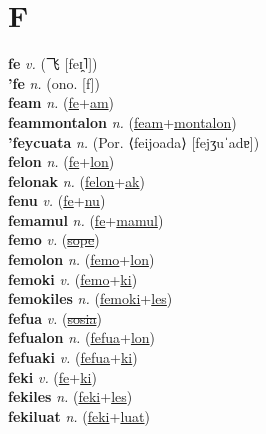 \section{F}

\textbf{fe} \textit{v.} ({\chinese{}飞} [feɪ̯˥])
 \label{fe} \\
\textbf{'fe} \textit{n.} (ono. [f])
 \label{'fe} \\
\textbf{feam} \textit{n.} (\hyperref[fe]{fe}+\hyperref[am]{am})
 \label{feam} \\
\textbf{feammontalon} \textit{n.} (\hyperref[feam]{feam}+\hyperref[montalon]{montalon})
 \label{feammontalon} \\
\textbf{'feycuata} \textit{n.} (Por. ⟨feijoada⟩ [fejʒuˈadɐ])
 \label{'feycuata} \\
\textbf{felon} \textit{n.} (\hyperref[fe]{fe}+\hyperref[lon]{lon})
 \label{felon} \\
\textbf{felonak} \textit{n.} (\hyperref[felon]{felon}+\hyperref[ak]{ak})
 \label{felonak} \\
\textbf{fenu} \textit{v.} (\hyperref[fe]{fe}+\hyperref[nu]{nu})
 \label{fenu} \\
\textbf{femamul} \textit{n.} (\hyperref[fe]{fe}+\hyperref[mamul]{mamul})
 \label{femamul} \\
\textbf{femo} \textit{v.} (\hyperref[sope]{\sout{sope}})
 \label{femo} \\
\textbf{femolon} \textit{n.} (\hyperref[femo]{femo}+\hyperref[lon]{lon})
 \label{femolon} \\
\textbf{femoki} \textit{v.} (\hyperref[femo]{femo}+\hyperref[ki]{ki})
 \label{femoki} \\
\textbf{femokiles} \textit{n.} (\hyperref[femoki]{femoki}+\hyperref[les]{les})
 \label{femokiles} \\
\textbf{fefua} \textit{v.} (\hyperref[sosia]{\sout{sosia}})
 \label{fefua} \\
\textbf{fefualon} \textit{n.} (\hyperref[fefua]{fefua}+\hyperref[lon]{lon})
 \label{fefualon} \\
\textbf{fefuaki} \textit{v.} (\hyperref[fefua]{fefua}+\hyperref[ki]{ki})
 \label{fefuaki} \\
\textbf{feki} \textit{v.} (\hyperref[fe]{fe}+\hyperref[ki]{ki})
 \label{feki} \\
\textbf{fekiles} \textit{n.} (\hyperref[feki]{feki}+\hyperref[les]{les})
 \label{fekiles} \\
\textbf{fekiluat} \textit{n.} (\hyperref[feki]{feki}+\hyperref[luat]{luat})
 \label{fekiluat} \\
